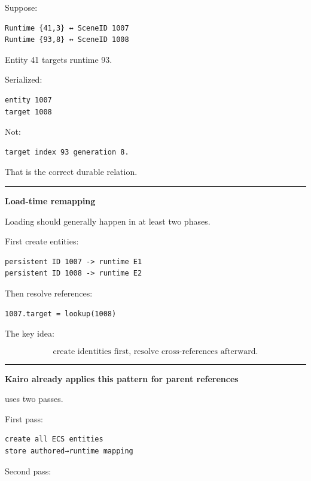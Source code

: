 Suppose:

\begin{verbatim}
Runtime {41,3} ↔ SceneID 1007
Runtime {93,8} ↔ SceneID 1008
\end{verbatim}

Entity 41 targets runtime 93.

Serialized:

\begin{verbatim}
entity 1007
target 1008
\end{verbatim}

Not:

\begin{verbatim}
target index 93 generation 8.
\end{verbatim}

That is the correct durable relation.

\begin{center}\rule{0.5\linewidth}{0.5pt}\end{center}

\textbf{Load-time remapping}

Loading should generally happen in at least two phases.

First create entities:

\begin{verbatim}
persistent ID 1007 -> runtime E1
persistent ID 1008 -> runtime E2
\end{verbatim}

Then resolve references:

\begin{verbatim}
1007.target = lookup(1008)
\end{verbatim}

The key idea:

\[
\boxed{
\text{create identities first,
resolve cross-references afterward}.
}
\]

\begin{center}\rule{0.5\linewidth}{0.5pt}\end{center}

\textbf{Kairo already applies this pattern for parent references}

 uses two passes.

First pass:

\begin{verbatim}
create all ECS entities
store authored→runtime mapping
\end{verbatim}

Second pass:


